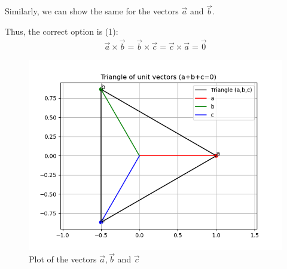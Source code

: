 \documentclass[journal]{IEEEtran}
\begin{document}
Similarly, we can show the same for the vectors $\vec{a}$ and $\vec{b}$.

Thus, the correct option is (1):
\begin{align}
    \vec{a}\times \vec{b}=\vec{b}\times \vec{c}=\vec{c}\times \vec{a}=\vec{0}
\end{align}



\begin{figure}[h!]
   \centering
   \includegraphics[width=0.7\linewidth]{figs/plot.png}
   \caption{Plot of the vectors $\vec{a}, \vec{b}$ and $\vec{c}$}
   \label{}
\end{figure}
\end{document}
